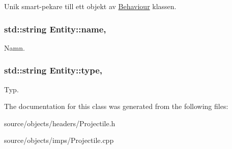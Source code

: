 Unik smart-\/pekare till ett objekt av \hyperlink{classBehaviour}{Behaviour} klassen. 

\hypertarget{classEntity_a931b21fbdebb1a5963b4bcab5df128f5}{
\subsubsection[{name}]{\setlength{\rightskip}{0pt plus 5cm}std\+::string Entity\+::name\hspace{0.3cm}{\ttfamily [protected]}, {\ttfamily [inherited]}}}\label{classEntity_a931b21fbdebb1a5963b4bcab5df128f5}


Namn. 

\hypertarget{classEntity_a298a9ebf2474bb00874b5ff6a0d637ef}{
\subsubsection[{type}]{\setlength{\rightskip}{0pt plus 5cm}std\+::string Entity\+::type\hspace{0.3cm}{\ttfamily [protected]}, {\ttfamily [inherited]}}}\label{classEntity_a298a9ebf2474bb00874b5ff6a0d637ef}


Typ. 



The documentation for this class was generated from the following files\+:\begin{DoxyCompactItemize}
\item 
source/objects/headers/Projectile.\+h\item 
source/objects/imps/Projectile.\+cpp\end{DoxyCompactItemize}
